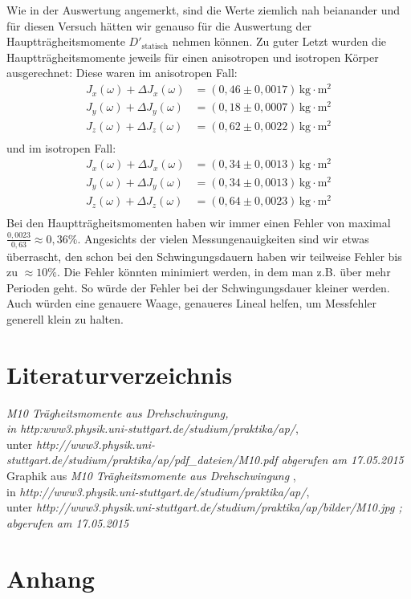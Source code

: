 \documentclass[fontsize=12pt]{scrartcl}
\begin{document}
Wie in der Auswertung angemerkt, sind die Werte ziemlich nah beianander und für diesen Versuch hätten wir genauso für die Auswertung der Hauptträgheitsmomente $D'_{\text{statisch}}$ nehmen können.
\newpage
\noindent
Zu guter Letzt wurden die Hauptträgheitsmomente jeweils für einen anisotropen und isotropen Körper ausgerechnet: 
Diese waren im anisotropen Fall:
\begin{align*}
J_x(\omega)+\Delta J_x(\omega) &=(0,46\pm 0,0017)\,\text{kg$\cdot$m$^2$} \\
J_y(\omega)+\Delta J_y(\omega) &=(0,18\pm 0,0007)\,\text{kg$\cdot$m$^2$} \\
J_z(\omega)+\Delta J_z(\omega) &=(0,62\pm  0,0022)\,\text{kg$\cdot$m$^2$}\\
\end{align*}
und im isotropen Fall:
\begin{align*}
J_x(\omega)+\Delta J_x(\omega) &=(0,34\pm  0,0013)\,\text{kg$\cdot$m$^2$}\\
J_y(\omega)+\Delta J_y(\omega) &=(0,34\pm  0,0013)\,\text{kg$\cdot$m$^2$}\\
J_z(\omega)+\Delta J_z(\omega) &=(0,64\pm 0,0023)\,\text{kg$\cdot$m$^2$} \\
\end{align*}
Bei den Hauptträgheitsmomenten haben wir immer einen Fehler von maximal $\frac{0,0023}{0,63}\approx 0,36\%$. Angesichts der vielen 
Messungenauigkeiten sind wir etwas überrascht, den schon bei den Schwingungsdauern haben wir teilweise Fehler bis zu $\approx 10\%$. 
Die Fehler könnten minimiert werden, in dem man z.B. über mehr Perioden geht. So würde der Fehler bei der Schwingungsdauer kleiner werden. Auch 
würden eine genauere Waage, genaueres Lineal helfen, um Messfehler generell klein zu halten.
\newpage
\section{Literaturverzeichnis}

\begin{thebibliography}{xxxxxxxx}
		\textit{\glqq M10 Trägheitsmomente aus Drehschwingung\grqq ,\\
							in http:www3.physik.uni-stuttgart.de/studium/praktika/ap/},\\ 
							unter \textit{http://www3.physik.uni-stuttgart.de/studium/praktika/ap/pdf\_dateien/M10.pdf abgerufen am 17.05.2015}	
  	Graphik aus \textit{\glqq M10 Trägheitsmomente aus Drehschwingung\grqq} , \\
							in 	\textit{http://www3.physik.uni-stuttgart.de/studium/praktika/ap/}, \\
   							 unter \textit{http://www3.physik.uni-stuttgart.de/studium/praktika/ap/bilder/M10.jpg ; abgerufen am 	17.05.2015} 

\end{thebibliography}

\section{Anhang}

\end{document}

